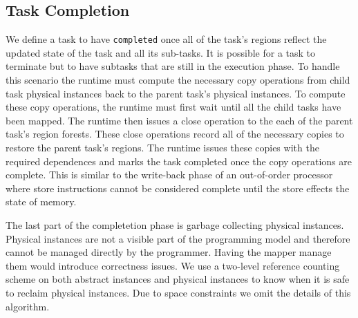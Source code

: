 \subsection{Task Completion}
\label{subsec:cleanup}
We define a task to have {\tt completed} once all of the task's regions reflect
the updated state of the task and all its sub-tasks.  
It is possible for a task to terminate but to have subtasks that are still in the execution phase.
To handle this scenario the runtime must compute the necessary copy operations
from child task physical instances back to the parent task's physical instances.  To
compute these copy operations, the runtime must first wait until all the child tasks
have been mapped.  The runtime then issues a close operation to the each of the parent
task's region forests.  These close operations record all of the necessary copies to
restore the parent task's regions.  
The runtime issues these copies with the required dependences
and marks the task completed once the copy operations are complete.
This is similar to the write-back phase of an out-of-order processor where store instructions cannot be
considered complete until the store effects the state of memory.

The last part of the completetion phase is garbage collecting physical instances.  Physical
instances are not a visible part of the programming model and therefore cannot be managed
directly by the programmer.  Having the mapper manage them would introduce correctness
issues.  We use a two-level reference counting scheme on both abstract instances and physical
instances to know when it is safe to reclaim physical instances.  Due to space constraints
we omit the details of this algorithm. 


